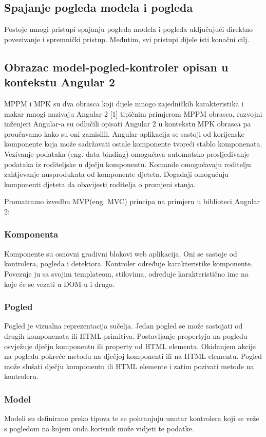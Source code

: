\documentclass[times, utf8, zavrsni]{fer}
\begin{document}
\subsection{Spajanje pogleda modela i pogleda}
Postoje mnogi pristupi spajanju pogleda modela i pogleda uključujući direktno povezivanje i spremnički pristup. Međutim, svi pristupi dijele isti konačni cilj.

\subsection{Obrazac model-pogled-kontroler opisan u kontekstu Angular 2}
MPPM i MPK su dva obrasca koji dijele mnogo zajedničkih karakteristika i makar mnogi nazivaju Angular 2 [1] tipičnim primjerom MPPM obrasca, razvojni inženjeri Angular-a su odlučili opisati Angular 2 u kontekstu MPK obrasca pa proučavamo kako su oni zamislili.
Angular aplikacija se sastoji od korijenske komponente koja može sadržavati ostale komponente tvoreći stablo komponenata. Vezivanje podataka (eng. data binding) omogućava automatsko prosljeđivanje podataka iz roditeljske u dječju komponentu. Komande omogućavaju roditelju zahtjevanje nusprodukata od komponente djeteta. Događaji omogućuju komponenti djeteta da obavijesti roditelja o promjeni stanja. 

Promatramo izvedbu MVP(eng. MVC) principa na primjeru u biblioteci Angular 2:

\subsubsection{Komponenta}
Komponente su osnovni gradivni blokovi web aplikacija. Oni se sastoje od kontrolera, pogleda i detektora. Kontroler određuje karakteristike komponente. Povezuje ju sa svojim templateom, stilovima, određuje karakteristično ime na koje će se vezati u DOM-u i drugo.

\subsubsection{Pogled}
Pogled je vizualna reprezentacija sučelja. Jedan pogled se može sastojati od drugih komponenata ili HTML primitiva. Postavljanje propertyja na pogledu osvježuje dječju komponentu ili property od HTML elementa. Okidanjem akcije na pogledu pokreće metodu na dječjoj komponenti ili na HTML elementu. Pogled može slušati dječju komponentu ili HTML elemente i zatim pozivati metode na kontroleru.

\subsubsection{Model}
Modeli su definirano preko tipova te se pohranjuju unutar kontrolera koji se veže s pogledom na kojem onda korisnik može vidjeti te podatke.
\end{document}
